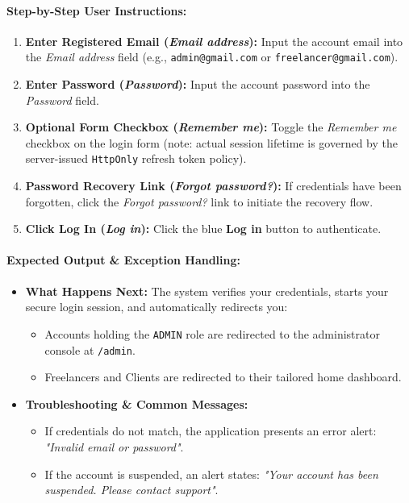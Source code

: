 \paragraph{Step-by-Step User Instructions:}
\begin{enumerate}[leftmargin=1.8em,itemsep=3pt]
  \item {} \textbf{Enter Registered Email (\textit{Email address}):} Input the account email into the \textit{Email address} field (e.g., \texttt{admin@gmail.com} or \texttt{freelancer@gmail.com}).
  \item {} \textbf{Enter Password (\textit{Password}):} Input the account password into the \textit{Password} field.
  \item {} \textbf{Optional Form Checkbox (\textit{Remember me}):} Toggle the \textit{Remember me} checkbox on the login form (note: actual session lifetime is governed by the server-issued \texttt{HttpOnly} refresh token policy).
  \item {} \textbf{Password Recovery Link (\textit{Forgot password?}):} If credentials have been forgotten, click the \textit{Forgot password?} link to initiate the recovery flow.
  \item {} \textbf{Click Log In (\textit{Log in}):} Click the blue \textbf{Log in} button to authenticate.
\end{enumerate}

\paragraph{Expected Output \& Exception Handling:}
\begin{itemize}[leftmargin=1.5em,itemsep=2pt]
  \item \textbf{What Happens Next:} The system verifies your credentials, starts your secure login session, and automatically redirects you:
    \begin{itemize}
      \item Accounts holding the \texttt{ADMIN} role are redirected to the administrator console at \texttt{/admin}.
      \item Freelancers and Clients are redirected to their tailored home dashboard.
    \end{itemize}
  \item \textbf{Troubleshooting \& Common Messages:}
    \begin{itemize}
      \item If credentials do not match, the application presents an error alert: \textit{"Invalid email or password"}.
      \item If the account is suspended, an alert states: \textit{"Your account has been suspended. Please contact support"}.
    \end{itemize}
\end{itemize}

